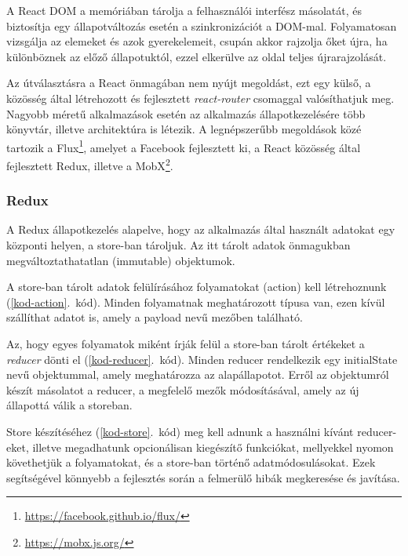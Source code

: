 \documentclass[
]{thesis-ekf}
\theoremstyle{definition}
\theoremstyle{remark}
\begin{document}
	A React DOM a memóriában tárolja a felhasználói interfész másolatát, és biztosítja egy állapotváltozás esetén a szinkronizációt a DOM-mal. Folyamatosan vizsgálja az elemeket és azok gyerekelemeit, csupán akkor rajzolja őket újra, ha különböznek az előző állapotuktól, ezzel elkerülve az oldal teljes újrarajzolását.
	
	Az útválasztásra a React önmagában nem nyújt megoldást, ezt egy külső, a közösség által létrehozott és fejlesztett \emph{react-router} csomaggal valósíthatjuk meg. Nagyobb méretű alkalmazások esetén az alkalmazás állapotkezelésére több könyvtár, illetve architektúra is létezik. A legnépszerűbb megoldások közé tartozik a Flux\footnote{\url{https://facebook.github.io/flux/}}, amelyet a Facebook fejlesztett ki, a React közösség által fejlesztett Redux, illetve a MobX\footnote{\url{https://mobx.js.org/}}.
	
	\subsubsection[Redux]{Redux\cite{redux}}
	A Redux állapotkezelés alapelve, hogy az alkalmazás által használt adatokat egy központi helyen, a store-ban tároljuk. Az itt tárolt adatok önmagukban megváltoztathatatlan (immutable) objektumok.
	
	A store-ban tárolt adatok felülírásához folyamatokat (action) kell létrehoznunk (\ref{kod-action}.~kód). Minden folyamatnak meghatározott típusa van, ezen kívül szállíthat adatot is, amely a payload nevű mezőben található.
	
	
	
	Az, hogy egyes folyamatok miként írják felül a store-ban tárolt értékeket a \emph{reducer} dönti el (\ref{kod-reducer}.~kód). Minden reducer rendelkezik egy initialState nevű objektummal, amely meghatározza az alapállapotot. Erről az objektumról készít másolatot a reducer, a megfelelő mezők módosításával, amely az új állapottá válik a storeban.
	
	
	
	Store készítéséhez (\ref{kod-store}.~kód) meg kell adnunk a használni kívánt reducer-eket, illetve megadhatunk opcionálisan kiegészítő funkciókat, mellyekkel nyomon követhetjük a folyamatokat, és a store-ban történő adatmódosulásokat. Ezek segítségével könnyebb a fejlesztés során a felmerülő hibák megkeresése és javítása.
	
\end{document}

